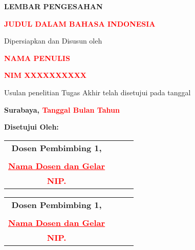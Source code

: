 \begin{center}
\begin{spacing}{1.5}
\setlength{\columnsep}{1cm}

\textbf{\Large LEMBAR PENGESAHAN }

\bigskip

\textbf{\textcolor{red}{\Large JUDUL DALAM BAHASA INDONESIA}}

\bigskip

\normalsize Dipersiapkan dan Disusun oleh

\normalsize \textbf{\textcolor{red}{NAMA PENULIS}}

\normalsize \textbf{\textcolor{red}{NIM XXXXXXXXXX}}

\vfill

\normalsize Usulan penelitian Tugas Akhir telah disetujui pada tanggal

\bigskip

\textbf{Surabaya, \textcolor{red}{Tanggal Bulan Tahun}}

\vfill

\textbf{Disetujui Oleh:}
\begin{multicols}{2}
\begin{tabular} { c c c c } 
\textbf{Dosen Pembimbing 1,} \\
\bigskip \\
\textbf{\textcolor{red}{\ul{Nama Dosen dan Gelar}}}\\
\textbf{\textcolor{red}{NIP.}} \\   
\end{tabular}

\begin{tabular} { c c c c } 
\textbf{Dosen Pembimbing 1,} \\
\bigskip \\
\textbf{\textcolor{red}{\ul{Nama Dosen dan Gelar}}}\\
\textbf{\textcolor{red}{NIP.}} \\   
\end{tabular}
\end{multicols}

\end{spacing}
\end{center}